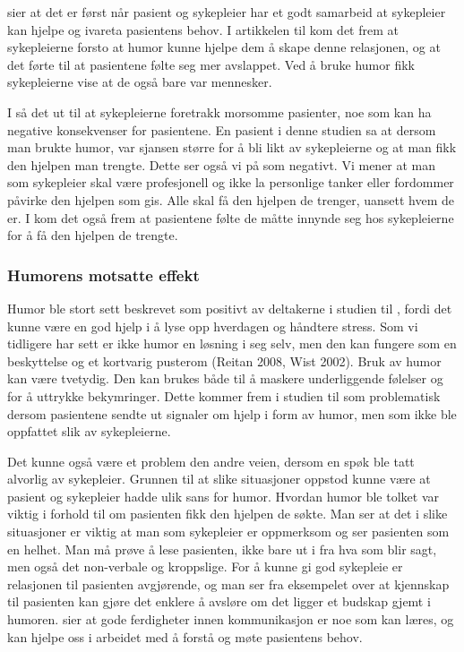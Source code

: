  sier at det er først når pasient og sykepleier har et
godt samarbeid at sykepleier kan hjelpe og ivareta pasientens behov. I
artikkelen til  kom det frem at sykepleierne forsto at humor
kunne hjelpe dem å skape denne relasjonen, og at det førte til at pasientene
følte seg mer avslappet. Ved å bruke humor fikk sykepleierne vise at de også
bare var mennesker.

I  så det ut til at sykepleierne foretrakk morsomme pasienter,
noe som kan ha negative konsekvenser for pasientene. En pasient i denne studien
sa at dersom man brukte humor, var sjansen større for å bli likt av
sykepleierne og at man fikk den hjelpen man trengte. Dette ser også vi på som
negativt. Vi mener at man som sykepleier skal være profesjonell og ikke la
personlige tanker eller fordommer påvirke den hjelpen som gis. Alle skal få den
hjelpen de trenger, uansett hvem de er. I  kom det også
frem at pasientene følte de måtte innynde seg hos sykepleierne for å få den
hjelpen de trengte.

\subsubsection{Humorens motsatte effekt}

Humor ble stort sett beskrevet som positivt av deltakerne i studien til
, fordi det kunne være en god hjelp i å lyse opp
hverdagen og håndtere stress. Som vi tidligere har sett er ikke humor en
løsning i seg selv, men den kan fungere som en beskyttelse og et kortvarig
pusterom (Reitan 2008, Wist 2002). Bruk av humor kan være tvetydig. Den kan
brukes både til å maskere underliggende følelser og for å uttrykke bekymringer.
Dette kommer frem i studien til  som problematisk dersom
pasientene sendte ut signaler om hjelp i form av humor, men som ikke ble
oppfattet slik av sykepleierne.

Det kunne også være et problem den andre veien, dersom en spøk ble tatt
alvorlig av sykepleier. Grunnen til at slike situasjoner oppstod kunne være at
pasient og sykepleier hadde ulik sans for humor. Hvordan humor ble tolket var
viktig i forhold til om pasienten fikk den hjelpen de søkte. Man ser at det i
slike situasjoner er viktig at man som sykepleier er oppmerksom og ser
pasienten som en helhet. Man må prøve å lese pasienten, ikke bare ut i fra hva
som blir sagt, men også det non-verbale og kroppslige. For å kunne gi god
sykepleie er relasjonen til pasienten avgjørende, og man ser fra eksempelet
over at kjennskap til pasienten kan gjøre det enklere å avsløre om det ligger
et budskap gjemt i humoren.  sier at gode ferdigheter
innen kommunikasjon er noe som kan læres, og kan hjelpe oss i arbeidet med å
forstå og møte pasientens behov.

